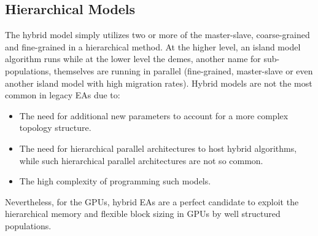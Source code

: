 \documentclass[prodmode,acmtecs]{acmsmall}
\begin{document}
\subsection{Hierarchical Models}

The hybrid model simply utilizes two or more of the master-slave, coarse-grained and fine-grained in a hierarchical method. At the higher level, an island model algorithm runs while at the lower level the demes, another name for sub-populations, themselves are running in parallel (fine-grained, master-slave or even another island model with high migration rates). Hybrid models are not the most common in legacy EAs due to:
\begin{itemize}
 \item The need for additional new parameters to account for a more complex topology structure. 
 \item The need for hierarchical parallel architectures to host hybrid algorithms, while such hierarchical parallel architectures are not so common. 
\item The high complexity of programming such models. 
\end{itemize}

Nevertheless, for the GPUs, hybrid EAs are a perfect candidate to exploit the hierarchical memory and flexible block sizing in GPUs by well structured populations. 
\end{document}
